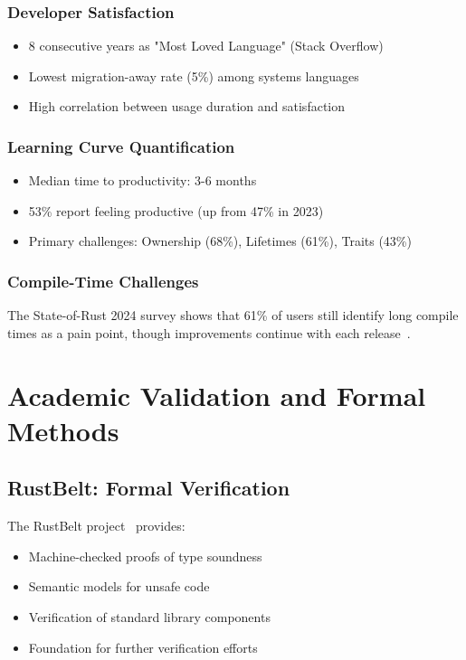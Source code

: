 \documentclass[11pt]{article}
\begin{document}
\subsubsection{Developer Satisfaction}
\begin{itemize}
    \item 8 consecutive years as "Most Loved Language" (Stack Overflow)
    \item Lowest migration-away rate (5\%) among systems languages~\cite{jetbrains2023}
    \item High correlation between usage duration and satisfaction
\end{itemize}

\subsubsection{Learning Curve Quantification}
\begin{itemize}
    \item Median time to productivity: 3-6 months~\cite{rustsurvey2024}
    \item 53\% report feeling productive (up from 47\% in 2023)
    \item Primary challenges: Ownership (68\%), Lifetimes (61\%), Traits (43\%)
\end{itemize}

\subsubsection{Compile-Time Challenges}
The State-of-Rust 2024 survey shows that 61\% of users still identify long compile times as a pain point, though improvements continue with each release~\cite{rustsurvey2024}.

\section{Academic Validation and Formal Methods}

\subsection{RustBelt: Formal Verification}

The RustBelt project~\cite{jung2018rustbelt} provides:
\begin{itemize}
    \item Machine-checked proofs of type soundness
    \item Semantic models for unsafe code
    \item Verification of standard library components
    \item Foundation for further verification efforts
\end{itemize}
\end{document}

